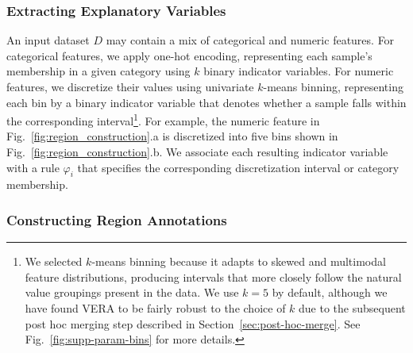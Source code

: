\documentclass[lettersize,journal]{IEEEtran}
\begin{document}
\subsubsection{Extracting Explanatory Variables}
\label{sec:discretization}

An input dataset $D$ may contain a mix of categorical and numeric features.
For categorical features, we apply one-hot encoding, representing each sample's membership in a given category using $k$ binary indicator variables.
For numeric features, we discretize their values using univariate $k$-means binning, representing each bin by a binary indicator variable that denotes whether a sample falls within the corresponding interval\footnote{We selected $k$-means binning because it adapts to skewed and multimodal feature distributions, producing intervals that more closely follow the natural value groupings present in the data. We use $k=5$ by default, although we have found VERA to be fairly robust to the choice of $k$ due to the subsequent post hoc merging step described in Section~\ref{sec:post-hoc-merge}. See Fig.~\ref{fig:supp-param-bins} for more details.}.
For example, the numeric feature in Fig.~\ref{fig:region_construction}.a is discretized into five bins shown in Fig.~\ref{fig:region_construction}.b.
We associate each resulting indicator variable with a rule $\varphi_i$ that specifies the corresponding discretization interval or category membership.

\subsubsection{Constructing Region Annotations}
\label{sec:region_construction}
\end{document}
